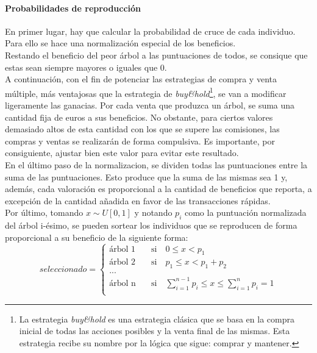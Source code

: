 \paragraph{Probabilidades de reproducci\'on}
En primer lugar, hay que calcular la probabilidad de cruce de cada individuo. Para ello se hace una normalizaci\'on especial de los beneficios.\\

Restando el beneficio del peor \'arbol a las puntuaciones de todos, se consique que estas sean siempre mayores o iguales que 0.\\

A continuaci\'on, con el fin de potenciar las estrategias de compra y venta m\'ultiple, m\'as ventajosas que la estrategia de \textit{buy\&hold}\footnote{La estrategia \textit{buy\&hold} es una estrategia cl\'asica que se basa en la compra inicial de todas las acciones posibles y la venta final de las mismas. Esta estrategia recibe su nombre por la l\'ogica que sigue: comprar y mantener.}, se van a modificar ligeramente las ganacias. Por cada venta que produzca un \'arbol, se suma una cantidad fija de euros a sus beneficios. No obstante, para ciertos valores demasiado altos de esta cantidad con los que se supere las comisiones, las compras y ventas se realizar\'an de forma compulsiva. Es importante, por consiguiente, ajustar bien este valor para evitar este resultado.\\

En el \'ultimo paso de la normalizacion, se dividen todas las puntuaciones entre la suma de las puntuaciones. Esto produce que la suma de las mismas sea 1 y, adem\'as, cada valoraci\'on es proporcional a la cantidad de beneficios que reporta, a excepci\'on de la cantidad a\~nadida en favor de las transacciones r\'apidas.\\

Por \'ultimo, tomando $x \sim U[0,1]$ y notando $p_i$ como la puntuaci\'on normalizada del \'arbol i-\'esimo, se pueden sortear los individuos que se reproducen de forma proporcional a su beneficio de la siguiente forma:\\

\[   
seleccionado = 
     \begin{cases}
       \text{\'arbol 1} &\quad\text{si}\quad 0 \leq x < p_1\\
       \text{\'arbol 2} &\quad\text{si}\quad p_1 \leq x < p_1 + p_2\\
       \text{...} \\
       \text{\'arbol n} &\quad\text{si}\quad \sum\limits_{i=1}^{n-1} p_i \leq x \leq \sum\limits_{i=1}^{n} p_i = 1\\ 
     \end{cases}
\]

